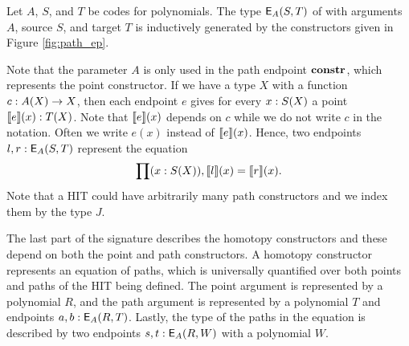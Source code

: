 \begin{figure*}[t]
\vspace{5pt}

\begin{center}
\begin{bprooftree}
\end{bprooftree}
\begin{bprooftree}
\end{bprooftree}
\end{center}
\caption{Rules for the path endpoints.}
\label{fig:path_ep}
\end{figure*}

\begin{definition}
Let $A$, $S$, and $T$ be codes for polynomials.
The type $\pathendpoint{A}{S}{T}$ of  with arguments $A$, source  $S$, and target $T$ is inductively generated by the constructors given in Figure \ref{fig:path_ep}.
\end{definition}

Note that the parameter $A$ is only used in the path endpoint $\constr$, which represents the point constructor.
If we have a type $X$ with a function $c : \polyAct{A}{X} \rightarrow X$,
then each endpoint $e$ gives for every $x : \polyAct{S}{X}$ a point $\pathendpointFun{e}(x) : \polyAct{T}{X}$.
Note that $\pathendpointFun{e}(x)$ depends on $c$ while we do not write $c$ in the notation.
Often we write $e(x)$ instead of $\pathendpointFun{e}(x)$.
Hence, two endpoints $l, r : \pathendpoint{A}{S}{T}$ represent the equation
\[
\depprod{(x : \polyAct{S}{X})}{\pathendpointAct{l}{x} = \pathendpointAct{r}{x}}.
\]
Note that a HIT could have arbitrarily many path constructors and we index them by the type $J$.

The last part of the signature describes the homotopy constructors
and these depend on both the point and path constructors.
A homotopy constructor represents an equation of paths, which is universally quantified over both points and paths of
the HIT being defined.
The point argument is represented by a polynomial $R$, and the path argument is represented by a polynomial $T$ and endpoints $a, b : \pathendpoint{A}{R}{T}$.
Lastly, the type of the paths in the equation is described by two endpoints $s, t : \pathendpoint{A}{R}{W}$ with a polynomial $W$.

